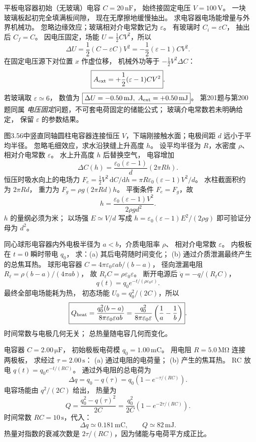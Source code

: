 平板电容器初始（无玻璃）电容
$C=20\,\mathrm{nF}$，
始终接固定电压 $V=100\,\mathrm V$。
一块玻璃板起初完全填满板间隙，
现在无摩擦地缓慢抽出。
求电容器电场能增量与外界机械功。
\exsolution
忽略边缘效应；玻璃相对介电常数记为 $\varepsilon$。
有玻璃时 $C_i=\varepsilon C$，
抽出后 $C_f=C$。
因电压固定，场能
$U=\frac12CV^2$，所以
\[
\boxed{\Delta U=
\frac12(C-\varepsilon C)V^2
=-\frac12(\varepsilon-1)CV^2}.
\]
在固定电压源下对位置 $x$ 作虚位移，
机械外功等于
$-\frac12V^2\Delta C$：
\[
\boxed{A_{\rm ext}=
+\frac12(\varepsilon-1)CV^2}.
\]
若玻璃取 $\varepsilon\simeq6$，
数值为
$\boxed{\Delta U=-0.50\,\mathrm{mJ},\;
A_{\rm ext}=+0.50\,\mathrm{mJ}}$。
\excheck 第201题与第200题同属
\emph{电压固定}问题，不可套电荷固定的储能公式；
玻璃介电常数若未明确给定，
保留 $\varepsilon$ 的参数结果。

图3.56中竖直同轴圆柱电容器连接恒压
$V$，下端刚接触水面；电极间距
$d$ 远小于平均半径。
忽略毛细效应，求水沿狭缝上升高度 $h$。
\exsolution
设平均半径为 $R$，水密度 $\rho$、
相对介电常数 $\varepsilon$。
水上升高度 $h$ 后替换空气，
电容增加
\[
\Delta C(h)=\frac{\varepsilon_0(\varepsilon-1)}
d(2\pi Rh).
\]
恒压时吸水向上的电场力
$F_e=\frac12V^2\,\mathrm dC/\mathrm dh
=\pi R\varepsilon_0(\varepsilon-1)V^2/d$。
水柱截面积约为 $2\pi Rd$，
重力为 $F_g=\rho g(2\pi Rd)h$。
平衡条件 $F_e=F_g$，故
\[
\boxed{h=
\frac{\varepsilon_0(\varepsilon-1)V^2}
{2\rho gd^2}}.
\]
\excheck $h$ 的量纲必须为米；
以场强 $E\simeq V/d$ 写成
$h=\varepsilon_0(\varepsilon-1)E^2/(2\rho g)$
即可验证分母为 $d^2$。

同心球形电容器内外电极半径为
$a<b$，介质电阻率 $\rho$、
相对介电常数 $\varepsilon$。
内极板在 $t=0$ 瞬时带电 $q_0$，
求：(a) 其后电荷随时间变化；
(b) 通过介质泄漏最终产生的总焦耳热。
\exsolution
球形电容器
$C=4\pi\varepsilon_0\varepsilon ab/(b-a)$，
径向泄漏电阻
$R_\ell=\rho(b-a)/(4\pi ab)$，
故
$R_\ell C=\rho\varepsilon_0\varepsilon$。
断开电源后
$\dot q=-q/(R_\ell C)$，
\[
\boxed{q(t)=q_0
e^{-t/(\rho\varepsilon_0\varepsilon)}}.
\]
最终全部电场能耗为热，
初态场能
$U_0=q_0^2/(2C)$，所以
\[
\boxed{Q_{\rm heat}=
\frac{q_0^2(b-a)}
{8\pi\varepsilon_0\varepsilon ab}
=\frac{q_0^2}{8\pi\varepsilon_0\varepsilon}
\left(\frac1a-\frac1b\right)}.
\]
\excheck 时间常数与电极几何无关；
总热量随电容几何而变化。

电容器 $C=2.00\,\mathrm{\mu F}$，
初始极板电荷模
$q_0=1.00\,\mathrm{mC}$。
用电阻 $R=5.0\,\mathrm{M\Omega}$ 连接两极板，
求经过 $\tau=2.00\,\mathrm s$：
(a) 通过电阻的电荷量；
(b) 产生的焦耳热。
\exsolution
RC 放电
$q(t)=q_0e^{-t/(RC)}$。
通过外电阻的总电荷为
\[
\boxed{\Delta q=q_0-q(\tau)
=q_0(1-e^{-\tau/(RC)})}.
\]
电容场能由 $q^2/(2C)$ 给出，
热量为
\[
\boxed{Q=
\frac{q_0^2-q(\tau)^2}{2C}
=\frac{q_0^2}{2C}
(1-e^{-2\tau/(RC)})}.
\]
时间常数 $RC=10\,\mathrm s$，代入：
\[
\boxed{\Delta q\simeq0.181\,\mathrm{mC}},
\qquad
\boxed{Q\simeq82\,\mathrm{mJ}}.
\]
\excheck 热量对指数的衰减次数是
$2\tau/(RC)$，因为储能与电荷平方成正比。

